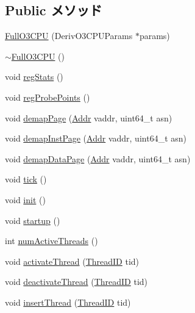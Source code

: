 \subsection*{Public メソッド}
\begin{DoxyCompactItemize}
\item 
\hyperlink{classFullO3CPU_aa8d6265cca6a8e1449d64b99483b1ecc}{FullO3CPU} (DerivO3CPUParams $\ast$params)
\item 
\hyperlink{classFullO3CPU_a6788b6adc1e142f49c6776ba4c85d824}{$\sim$FullO3CPU} ()
\item 
void \hyperlink{classFullO3CPU_a4dc637449366fcdfc4e764cdf12d9b11}{regStats} ()
\item 
void \hyperlink{classFullO3CPU_aa2dab17a363fd4307274d579796adcf7}{regProbePoints} ()
\item 
void \hyperlink{classFullO3CPU_a2d698ff909513b48a1263f8a5440e067}{demapPage} (\hyperlink{base_2types_8hh_af1bb03d6a4ee096394a6749f0a169232}{Addr} vaddr, uint64\_\-t asn)
\item 
void \hyperlink{classFullO3CPU_ac8a36d45a839b07f50b73f1eee119615}{demapInstPage} (\hyperlink{base_2types_8hh_af1bb03d6a4ee096394a6749f0a169232}{Addr} vaddr, uint64\_\-t asn)
\item 
void \hyperlink{classFullO3CPU_a26789603cc94992d18f8ddedfff96acf}{demapDataPage} (\hyperlink{base_2types_8hh_af1bb03d6a4ee096394a6749f0a169232}{Addr} vaddr, uint64\_\-t asn)
\item 
void \hyperlink{classFullO3CPU_a873dd91783f9efb4a590aded1f70d6b0}{tick} ()
\item 
void \hyperlink{classFullO3CPU_a02fd73d861ef2e4aabb38c0c9ff82947}{init} ()
\item 
void \hyperlink{classFullO3CPU_aecc7d8debf54990ffeaaed5bac7d7d81}{startup} ()
\item 
int \hyperlink{classFullO3CPU_a2cf759e627e96ea55f7b91a72d437652}{numActiveThreads} ()
\item 
void \hyperlink{classFullO3CPU_a687aa4600423bb30ecf3bb1da6cd6000}{activateThread} (\hyperlink{base_2types_8hh_ab39b1a4f9dad884694c7a74ed69e6a6b}{ThreadID} tid)
\item 
void \hyperlink{classFullO3CPU_ad11d9216ad92d9036ebf37844cf6e706}{deactivateThread} (\hyperlink{base_2types_8hh_ab39b1a4f9dad884694c7a74ed69e6a6b}{ThreadID} tid)
\item 
void \hyperlink{classFullO3CPU_abf4dca4fa0a9358ec4ac26ccbf17233b}{insertThread} (\hyperlink{base_2types_8hh_ab39b1a4f9dad884694c7a74ed69e6a6b}{ThreadID} tid)
\item 

\end{DoxyCompactItemize}
